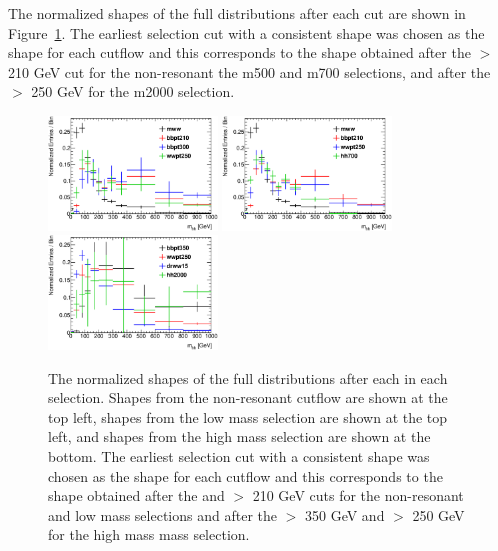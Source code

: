 The normalized shapes of the full \mbb distributions after each 
cut are shown in Figure~\ref{fig:mbbShapes}. The earliest selection cut with a consistent shape was chosen as the
shape for each cutflow and this corresponds to the shape obtained
after the  \ptbb $>$ 210 GeV cut 
for the non-resonant the m500 and m700  selections,  and after the  \ptww $>$ 250 GeV for the m2000 selection.

\begin{figure}[h!]
\begin{center}
\includegraphics[width=0.4\textwidth]{figures/multijet/reOptNonRes_mbbShape_individualCuts_elmu}
\includegraphics[width=0.4\textwidth]{figures/multijet/reOpt700_mbbShape_individualCuts_elmu}
\includegraphics[width=0.4\textwidth]{figures/multijet/reOpt2000_mbbShape_individualCuts_elmu}
\end{center}

\caption[The normalized shapes of the full \mbb distributions]{The normalized shapes of the full \mbb distributions after
  each in each selection. Shapes from the non-resonant cutflow are
  shown at the top left, shapes from the low mass selection are shown
  at the top left, and shapes from the high mass selection are shown
  at the bottom. The earliest selection cut with a consistent shape
  was chosen as the shape for each cutflow and this corresponds to the
  shape obtained after the \mww and \ptbb $>$ 210 GeV cuts for the
  non-resonant and low mass selections and after the \ptbb $>$ 350 GeV
  and \ptww $>$ 250 GeV for the high mass mass selection.} \label{fig:mbbShapes}
\end{figure}

